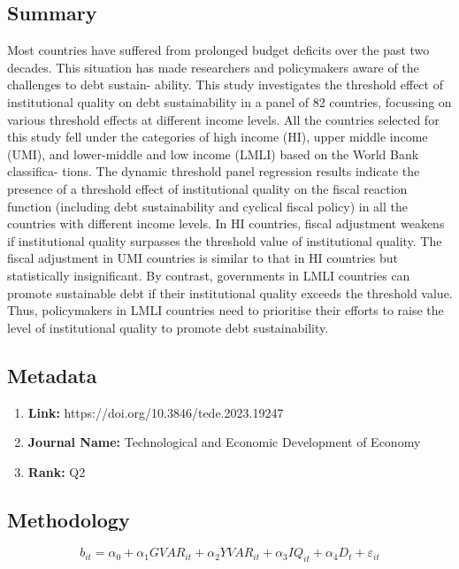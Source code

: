 \documentclass[10pt, oneside]{article}
\begin{document}
\subsection{Summary}
Most countries have suffered from prolonged budget deficits over the past two decades.
This situation has made researchers and policymakers aware of the challenges to debt sustain-
ability. This study investigates the threshold effect of institutional quality on debt sustainability
in a panel of 82 countries, focussing on various threshold effects at different income levels. All
the countries selected for this study fell under the categories of high income (HI), upper middle
income (UMI), and lower-middle and low income (LMLI) based on the World Bank classifica-
tions. The dynamic threshold panel regression results indicate the presence of a threshold effect
of institutional quality on the fiscal reaction function (including debt sustainability and cyclical
fiscal policy) in all the countries with different income levels. In HI countries, fiscal adjustment
weakens if institutional quality surpasses the threshold value of institutional quality. The fiscal
adjustment in UMI countries is similar to that in HI countries but statistically insignificant. By
contrast, governments in LMLI countries can promote sustainable debt if their institutional quality
exceeds the threshold value. Thus, policymakers in LMLI countries need to prioritise their
efforts to raise the level of institutional quality to promote debt sustainability. \cite{Lee_Ahmad_Karim_Khalid_2023}
\subsection{Metadata}
\begin{enumerate}
	\item \textbf{Link:} https://doi.org/10.3846/tede.2023.19247
	\item \textbf{Journal Name:} Technological and Economic Development of Economy
	\item \textbf{Rank:} Q2
\end{enumerate}

\subsection{Methodology}

\begin{equation}
	b_{it} = \alpha_0 + \alpha_1 GVAR_{it} + \alpha_2 YVAR_{it} + \alpha_3 IQ_{it} + \alpha_4 D_{t} + \varepsilon_{it}
\end{equation}
\end{document}
